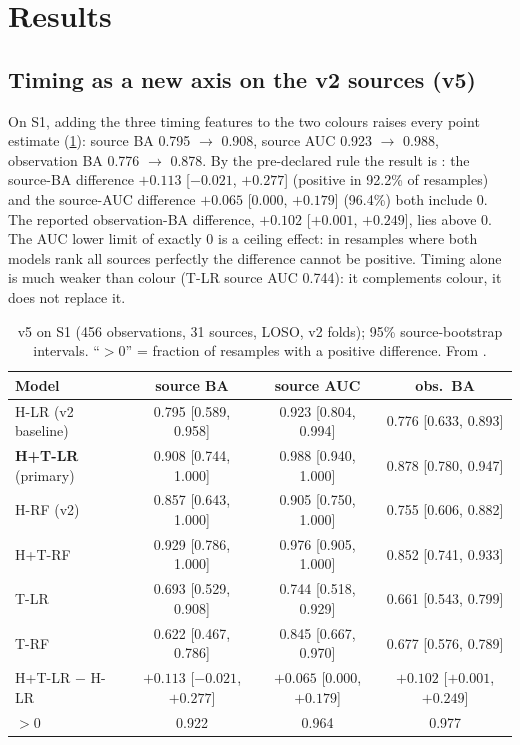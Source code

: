 \section{Results}\label{sec:p3results}

\subsection{Timing as a new axis on the v2 sources (v5)}\label{sec:p3v5}
\Primary{} On S1, adding the three timing features to the two colours raises every point estimate (\cref{tab:p3v5}):
source BA 0.795 $\to$ 0.908, source AUC 0.923 $\to$ 0.988, observation BA 0.776 $\to$ 0.878. By the pre-declared rule
the result is \NotDetected{}: the source-BA difference $+0.113$ [$-0.021$, $+0.277$] (positive in 92.2\% of resamples)
and the source-AUC difference $+0.065$ [0.000, $+0.179$] (96.4\%) both include 0. The reported observation-BA difference,
$+0.102$ [$+0.001$, $+0.249$], lies above 0. The AUC lower limit of exactly 0 is a ceiling effect: in resamples where
both models rank all sources perfectly the difference cannot be positive. Timing alone is much weaker than colour
(T-LR source AUC 0.744): it complements colour, it does not replace it.

\begin{table}[htbp]
\centering\small
\caption[v5 primary result]{\Primary{} v5 on S1 (456 observations, 31 sources, LOSO, v2 folds); 95\% source-bootstrap
intervals. ``$>0$'' = fraction of resamples with a positive difference. From .}
\label{tab:p3v5}
\setlength{\tabcolsep}{4pt}
\begin{tabular}{@{}lccc@{}}
\toprule
Model & source BA & source AUC & obs.\ BA \\
\midrule
H-LR (v2 baseline) & 0.795 [0.589, 0.958] & 0.923 [0.804, 0.994] & 0.776 [0.633, 0.893] \\
\textbf{H+T-LR} (primary) & 0.908 [0.744, 1.000] & 0.988 [0.940, 1.000] & 0.878 [0.780, 0.947] \\
H-RF (v2) & 0.857 [0.643, 1.000] & 0.905 [0.750, 1.000] & 0.755 [0.606, 0.882] \\
H+T-RF & 0.929 [0.786, 1.000] & 0.976 [0.905, 1.000] & 0.852 [0.741, 0.933] \\
T-LR & 0.693 [0.529, 0.908] & 0.744 [0.518, 0.929] & 0.661 [0.543, 0.799] \\
T-RF & 0.622 [0.467, 0.786] & 0.845 [0.667, 0.970] & 0.677 [0.576, 0.789] \\
\midrule
H+T-LR $-$ H-LR & $+0.113$ [$-0.021$, $+0.277$] & $+0.065$ [0.000, $+0.179$] & $+0.102$ [$+0.001$, $+0.249$] \\
\quad $>0$ & 0.922 & 0.964 & 0.977 \\
\bottomrule
\end{tabular}
\end{table}

